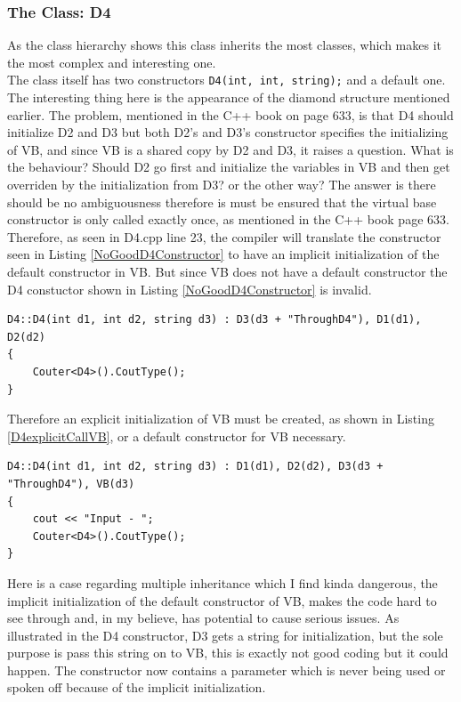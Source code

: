 \subsubsection{The Class: D4}\label{d4}
As the class hierarchy shows this class inherits the most classes, which makes it the most complex and interesting one.\\
The class itself has two constructors \lstinline$D4(int, int, string);$ and a default one.
The interesting thing here is the appearance of the diamond structure mentioned earlier. 
The problem, mentioned in the C++ book on page 633, is that D4 should initialize D2 and D3 but both D2's and D3's constructor specifies the initializing of VB, and since VB is a shared copy by D2 and D3, it raises a question. 
What is the behaviour?
Should D2 go first and initialize the variables in VB and then get overriden by the initialization from D3? or the other way?
The answer is there should be no ambiguousness therefore is must be ensured that the virtual base constructor is only called exactly once, as mentioned in the C++ book page 633. 
Therefore, as seen in D4.cpp line 23, the compiler will translate the constructor seen in Listing \ref{NoGoodD4Constructor} to have an implicit initialization of the default constructor in VB.
But since VB does not have a default constructor the D4 constuctor shown in Listing \ref{NoGoodD4Constructor} is invalid.
\begin{lstlisting}[caption=Code snippet from D4.cpp file line 23, label=NoGoodD4Constructor]
D4::D4(int d1, int d2, string d3) : D3(d3 + "ThroughD4"), D1(d1), D2(d2)
{
	Couter<D4>().CoutType();
}
\end{lstlisting}
Therefore an explicit initialization of VB must be created, as shown in Listing \ref{D4explicitCallVB}, or a default constructor for VB necessary.
\begin{lstlisting}[caption=Code snippet from D4.cpp file line 5, label=D4explicitCallVB]
D4::D4(int d1, int d2, string d3) : D1(d1), D2(d2), D3(d3 + "ThroughD4"), VB(d3)
{
	cout << "Input - ";
	Couter<D4>().CoutType();
}
\end{lstlisting}
Here is a case regarding multiple inheritance which I find kinda dangerous, the implicit initialization of the default constructor of VB, makes the code hard to see through and, in my believe, has potential to cause serious issues. As illustrated in the D4 constructor, D3 gets a string for initialization, but the sole purpose is pass this string on to VB, this is exactly not good coding but it could happen.
The constructor now contains a parameter which is never being used or spoken off because of the implicit initialization. 
